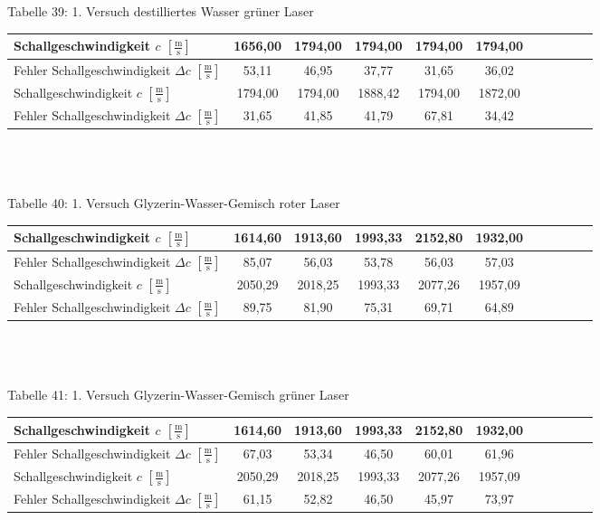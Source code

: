 \documentclass[fontsize=12pt]{scrartcl}
\begin{document}
~\\
~\\ 
Tabelle 39: 1. Versuch destilliertes Wasser grüner Laser \\
\begin{tabular}{|l|c|c|c|c|c|c|c|c|c|c|} \hline
Schallgeschwindigkeit $c$ $[\frac{{\text{m}}}{{\text{s}}}]$ & 1656,00 & 1794,00 & 1794,00 & 1794,00 & 1794,00 \\ \hline
Fehler Schallgeschwindigkeit $\Delta c$ $[\frac{{\text{m}}}{{\text{s}}}]$ & 53,11 & 
46,95 & 
37,77 & 
31,65 & 
36,02 
 \\ \hline
Schallgeschwindigkeit $c$ $[\frac{{\text{m}}}{{\text{s}}}]$ & 1794,00 &1794,00 & 1888,42 & 1794,00 & 1872,00 \\ \hline
Fehler Schallgeschwindigkeit $\Delta c$ $[\frac{{\text{m}}}{{\text{s}}}]$ & 
31,65 & 
41,85 & 
41,79 & 
67,81 & 
34,42  \\ \hline
\end{tabular} \\

~\\
~\\
Tabelle 40: 1. Versuch Glyzerin-Wasser-Gemisch roter Laser \\
\begin{tabular}{|l|c|c|c|c|c|c|c|c|c|c|} \hline
Schallgeschwindigkeit $c$ $[\frac{{\text{m}}}{{\text{s}}}]$ & 1614,60 & 1913,60 & 1993,33 & 2152,80 & 1932,00    \\ \hline
Fehler Schallgeschwindigkeit $\Delta c$ $[\frac{{\text{m}}}{{\text{s}}}]$ & 85,07 & 
56,03 & 
53,78 & 
56,03 & 
57,03 
  \\ \hline
Schallgeschwindigkeit $c$ $[\frac{{\text{m}}}{{\text{s}}}]$ &  2050,29 & 2018,25 & 1993,33 & 2077,26 & 1957,09 \\ \hline
Fehler Schallgeschwindigkeit $\Delta c$ $[\frac{{\text{m}}}{{\text{s}}}]$ & 
89,75 & 
81,90 & 
75,31 & 
69,71 & 
64,89  \\ \hline
\end{tabular} \\

~\\
~\\
Tabelle 41: 1. Versuch Glyzerin-Wasser-Gemisch grüner Laser\\
\begin{tabular}{|l|c|c|c|c|c|c|c|c|c|c|} \hline
Schallgeschwindigkeit $c$ $[\frac{{\text{m}}}{{\text{s}}}]$ & 1614,60 & 1913,60 & 1993,33 & 2152,80 & 1932,00  \\ \hline
Fehler Schallgeschwindigkeit $\Delta c$ $[\frac{{\text{m}}}{{\text{s}}}]$ & 67,03 & 
53,34  & 
46,50 & 
60,01 & 
61,96 
 \\ \hline
Schallgeschwindigkeit $c$ $[\frac{{\text{m}}}{{\text{s}}}]$ & 2050,29 &  2018,25 & 1993,33 & 2077,26 & 1957,09  \\ \hline
Fehler Schallgeschwindigkeit $\Delta c$ $[\frac{{\text{m}}}{{\text{s}}}]$ & 
61,15 & 
52,82 & 
46,50 & 
45,97 & 
73,97 \\ \hline
\end{tabular} \\
\end{document}
